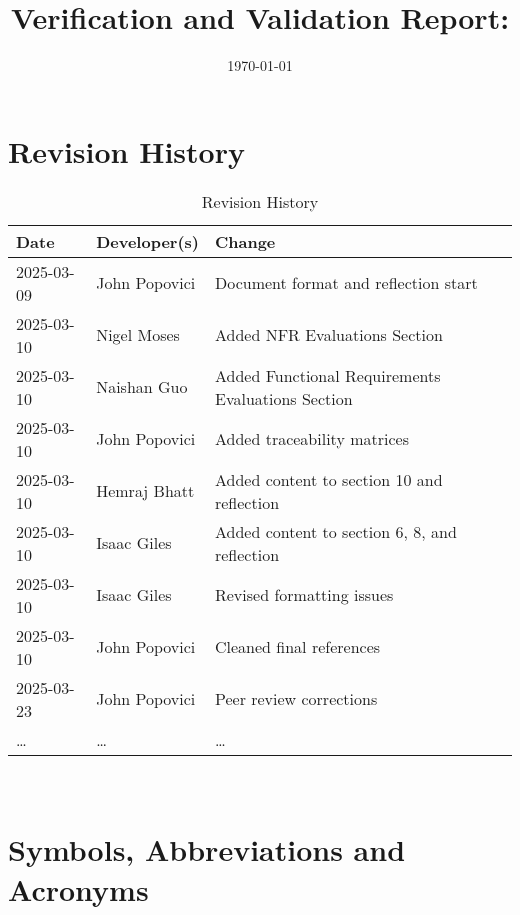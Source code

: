 \documentclass[12pt, titlepage]{article}
\begin{document}
\title{Verification and Validation Report: \progname} 
\author{\authname}
\date{\today}
	
\maketitle


\section{Revision History}

\begin{table}[hp]
\caption{Revision History} \label{TblRevisionHistory}
\begin{tabularx}{\textwidth}{llX}
\toprule
\textbf{Date} & \textbf{Developer(s)} & \textbf{Change}\\
\midrule
2025-03-09 & John Popovici & Document format and reflection start\\
2025-03-10 & Nigel Moses & Added NFR Evaluations Section\\
2025-03-10 & Naishan Guo & Added Functional Requirements Evaluations Section\\
2025-03-10 & John Popovici & Added traceability matrices\\
2025-03-10 & Hemraj Bhatt & Added content to section 10 and reflection\\
2025-03-10 & Isaac Giles & Added content to section 6, 8, and reflection\\
2025-03-10 & Isaac Giles & Revised formatting issues\\
2025-03-10 & John Popovici & Cleaned final references\\
2025-03-23 & John Popovici & Peer review corrections\\
\dots & \dots & \dots \\
\bottomrule
\end{tabularx}
\end{table}

~\newpage

\section{Symbols, Abbreviations and Acronyms}
\end{document}
